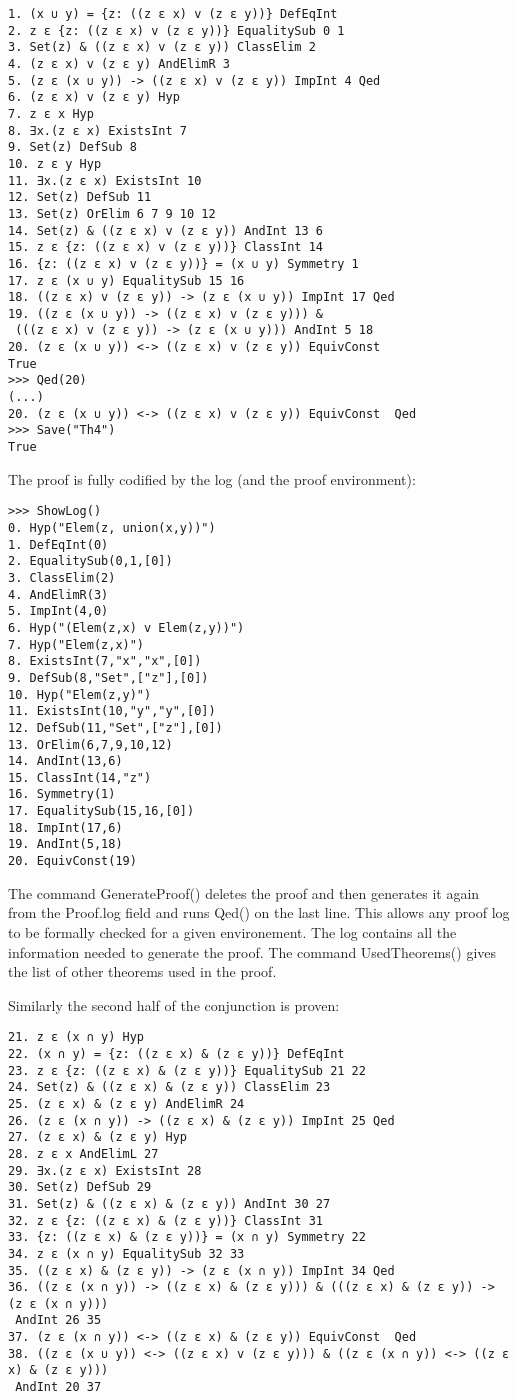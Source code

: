\documentclass[12pt,leqno]{article}
\numberwithin{equation}{section}
\begin{document}
\begin{verbatim}
1. (x ∪ y) = {z: ((z ε x) v (z ε y))} DefEqInt 
2. z ε {z: ((z ε x) v (z ε y))} EqualitySub 0 1
3. Set(z) & ((z ε x) v (z ε y)) ClassElim 2
4. (z ε x) v (z ε y) AndElimR 3
5. (z ε (x ∪ y)) -> ((z ε x) v (z ε y)) ImpInt 4 Qed
6. (z ε x) v (z ε y) Hyp 
7. z ε x Hyp 
8. ∃x.(z ε x) ExistsInt 7
9. Set(z) DefSub 8
10. z ε y Hyp 
11. ∃x.(z ε x) ExistsInt 10
12. Set(z) DefSub 11
13. Set(z) OrElim 6 7 9 10 12
14. Set(z) & ((z ε x) v (z ε y)) AndInt 13 6
15. z ε {z: ((z ε x) v (z ε y))} ClassInt 14
16. {z: ((z ε x) v (z ε y))} = (x ∪ y) Symmetry 1
17. z ε (x ∪ y) EqualitySub 15 16
18. ((z ε x) v (z ε y)) -> (z ε (x ∪ y)) ImpInt 17 Qed
19. ((z ε (x ∪ y)) -> ((z ε x) v (z ε y))) &
 (((z ε x) v (z ε y)) -> (z ε (x ∪ y))) AndInt 5 18
20. (z ε (x ∪ y)) <-> ((z ε x) v (z ε y)) EquivConst 
True
>>> Qed(20)
(...)
20. (z ε (x ∪ y)) <-> ((z ε x) v (z ε y)) EquivConst  Qed
>>> Save("Th4")
True
\end{verbatim}

The proof is fully codified by the log (and the proof environment):

\begin{verbatim}
>>> ShowLog()
0. Hyp("Elem(z, union(x,y))")
1. DefEqInt(0)
2. EqualitySub(0,1,[0])
3. ClassElim(2)
4. AndElimR(3)
5. ImpInt(4,0)
6. Hyp("(Elem(z,x) v Elem(z,y))")
7. Hyp("Elem(z,x)")
8. ExistsInt(7,"x","x",[0])
9. DefSub(8,"Set",["z"],[0])
10. Hyp("Elem(z,y)")
11. ExistsInt(10,"y","y",[0])
12. DefSub(11,"Set",["z"],[0])
13. OrElim(6,7,9,10,12)
14. AndInt(13,6)
15. ClassInt(14,"z")
16. Symmetry(1)
17. EqualitySub(15,16,[0])
18. ImpInt(17,6)
19. AndInt(5,18)
20. EquivConst(19)
\end{verbatim}	

The command GenerateProof() deletes the proof and then generates it again from the Proof.log  field and runs Qed() on the last line. This allows
any proof log to be formally checked for a given environement. The log  contains all the information needed to generate the proof.
The command UsedTheorems() gives the list of other theorems used in the proof.

Similarly the second half of the conjunction is proven:

\begin{verbatim}
21. z ε (x ∩ y) Hyp 
22. (x ∩ y) = {z: ((z ε x) & (z ε y))} DefEqInt 
23. z ε {z: ((z ε x) & (z ε y))} EqualitySub 21 22
24. Set(z) & ((z ε x) & (z ε y)) ClassElim 23
25. (z ε x) & (z ε y) AndElimR 24
26. (z ε (x ∩ y)) -> ((z ε x) & (z ε y)) ImpInt 25 Qed
27. (z ε x) & (z ε y) Hyp 
28. z ε x AndElimL 27
29. ∃x.(z ε x) ExistsInt 28
30. Set(z) DefSub 29
31. Set(z) & ((z ε x) & (z ε y)) AndInt 30 27
32. z ε {z: ((z ε x) & (z ε y))} ClassInt 31
33. {z: ((z ε x) & (z ε y))} = (x ∩ y) Symmetry 22
34. z ε (x ∩ y) EqualitySub 32 33
35. ((z ε x) & (z ε y)) -> (z ε (x ∩ y)) ImpInt 34 Qed
36. ((z ε (x ∩ y)) -> ((z ε x) & (z ε y))) & (((z ε x) & (z ε y)) -> (z ε (x ∩ y)))
 AndInt 26 35
37. (z ε (x ∩ y)) <-> ((z ε x) & (z ε y)) EquivConst  Qed
38. ((z ε (x ∪ y)) <-> ((z ε x) v (z ε y))) & ((z ε (x ∩ y)) <-> ((z ε x) & (z ε y)))
 AndInt 20 37
\end{verbatim}	
\end{document}

